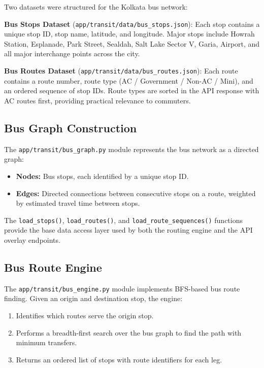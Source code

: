 \documentclass[12pt, a4paper]{report}
\begin{document}
Two datasets were structured for the Kolkata bus network:

\textbf{Bus Stops Dataset} (\texttt{app/transit/data/bus\_stops.json}): Each stop contains a unique stop ID, stop name, latitude, and longitude. Major stops include Howrah Station, Esplanade, Park Street, Sealdah, Salt Lake Sector V, Garia, Airport, and all major interchange points across the city.

\textbf{Bus Routes Dataset} (\texttt{app/transit/data/bus\_routes.json}): Each route contains a route number, route type (AC / Government / Non-AC / Mini), and an ordered sequence of stop IDs. Route types are sorted in the API response with AC routes first, providing practical relevance to commuters.

\subsection{Bus Graph Construction}

The \texttt{app/transit/bus\_graph.py} module represents the bus network as a directed graph:

\begin{itemize}
    \item \textbf{Nodes:} Bus stops, each identified by a unique stop ID.
    \item \textbf{Edges:} Directed connections between consecutive stops on a route, weighted by estimated travel time between stops.
\end{itemize}

The \texttt{load\_stops()}, \texttt{load\_routes()}, and \texttt{load\_route\_sequences()} functions provide the base data access layer used by both the routing engine and the API overlay endpoints.

\subsection{Bus Route Engine}

The \texttt{app/transit/bus\_engine.py} module implements BFS-based bus route finding. Given an origin and destination stop, the engine:

\begin{enumerate}
    \item Identifies which routes serve the origin stop.
    \item Performs a breadth-first search over the bus graph to find the path with minimum transfers.
    \item Returns an ordered list of stops with route identifiers for each leg.
\end{enumerate}
\end{document}
